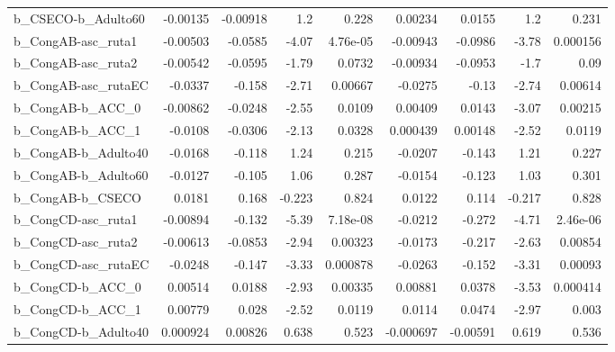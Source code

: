 \begin{tabular}{lrrrrrrrr}
b\_CSECO-b\_Adulto60         &    -0.00135 &     -0.00918 &       1.2 &    0.228 &    0.00234 &      0.0155 &          1.2 &         0.231 \\
b\_CongAB-asc\_ruta1         &    -0.00503 &      -0.0585 &     -4.07 & 4.76e-05 &   -0.00943 &     -0.0986 &        -3.78 &      0.000156 \\
b\_CongAB-asc\_ruta2         &    -0.00542 &      -0.0595 &     -1.79 &   0.0732 &   -0.00934 &     -0.0953 &         -1.7 &          0.09 \\
b\_CongAB-asc\_rutaEC        &     -0.0337 &       -0.158 &     -2.71 &  0.00667 &    -0.0275 &       -0.13 &        -2.74 &       0.00614 \\
b\_CongAB-b\_ACC\_0           &    -0.00862 &      -0.0248 &     -2.55 &   0.0109 &    0.00409 &      0.0143 &        -3.07 &       0.00215 \\
b\_CongAB-b\_ACC\_1           &     -0.0108 &      -0.0306 &     -2.13 &   0.0328 &   0.000439 &     0.00148 &        -2.52 &        0.0119 \\
b\_CongAB-b\_Adulto40        &     -0.0168 &       -0.118 &      1.24 &    0.215 &    -0.0207 &      -0.143 &         1.21 &         0.227 \\
b\_CongAB-b\_Adulto60        &     -0.0127 &       -0.105 &      1.06 &    0.287 &    -0.0154 &      -0.123 &         1.03 &         0.301 \\
b\_CongAB-b\_CSECO           &      0.0181 &        0.168 &    -0.223 &    0.824 &     0.0122 &       0.114 &       -0.217 &         0.828 \\
b\_CongCD-asc\_ruta1         &    -0.00894 &       -0.132 &     -5.39 & 7.18e-08 &    -0.0212 &      -0.272 &        -4.71 &      2.46e-06 \\
b\_CongCD-asc\_ruta2         &    -0.00613 &      -0.0853 &     -2.94 &  0.00323 &    -0.0173 &      -0.217 &        -2.63 &       0.00854 \\
b\_CongCD-asc\_rutaEC        &     -0.0248 &       -0.147 &     -3.33 & 0.000878 &    -0.0263 &      -0.152 &        -3.31 &       0.00093 \\
b\_CongCD-b\_ACC\_0           &     0.00514 &       0.0188 &     -2.93 &  0.00335 &    0.00881 &      0.0378 &        -3.53 &      0.000414 \\
b\_CongCD-b\_ACC\_1           &     0.00779 &        0.028 &     -2.52 &   0.0119 &     0.0114 &      0.0474 &        -2.97 &         0.003 \\
b\_CongCD-b\_Adulto40        &    0.000924 &      0.00826 &     0.638 &    0.523 &  -0.000697 &    -0.00591 &        0.619 &         0.536 \\

\end{tabular}
